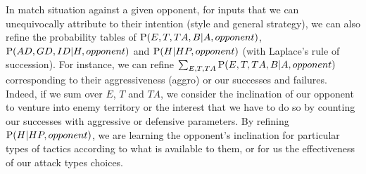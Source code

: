 In match situation against a given opponent, for inputs that we can unequivocally attribute to their intention (style and general strategy), we can also refine the probability tables of $\mathrm{P}(E,T,TA,B|A,opponent)$, $\mathrm{P}(AD,GD,ID|H,opponent)$ and $\mathrm{P}(H|HP,opponent)$ (with Laplace's rule of succession). For instance, we can refine $\sum_{E,T,TA}\mathrm{P}(E,T,TA,B|A,opponent)$ corresponding to their aggressiveness (aggro) or our successes and failures. Indeed, if we sum over $E$, $T$ and $TA$, we consider the inclination of our opponent to venture into enemy territory or the interest that we have to do so by counting our successes with aggressive or defensive parameters. By refining $\mathrm{P}(H|HP,opponent)$, we are learning the opponent's inclination for particular types of tactics according to what is available to them, or for us the effectiveness of our attack types choices.


